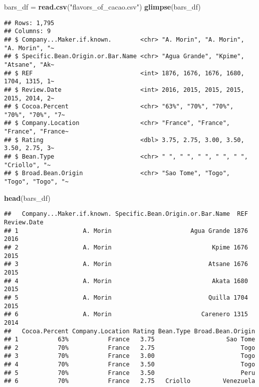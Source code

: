 \documentclass[
]{article}
\newenvironment{Shaded}{\begin{snugshade}}{\end{snugshade}}
\newcommand{\FunctionTok}[1]{\textcolor[rgb]{0.13,0.29,0.53}{\textbf{#1}}}
\newcommand{\NormalTok}[1]{#1}
\newcommand{\OtherTok}[1]{\textcolor[rgb]{0.56,0.35,0.01}{#1}}
\newcommand{\StringTok}[1]{\textcolor[rgb]{0.31,0.60,0.02}{#1}}
\begin{document}
\begin{Shaded}
\begin{Highlighting}[]
\NormalTok{bars\_df }\OtherTok{=} \FunctionTok{read.csv}\NormalTok{(}\StringTok{"flavors\_of\_cacao.csv"}\NormalTok{)}
\FunctionTok{glimpse}\NormalTok{(bars\_df)}
\end{Highlighting}
\end{Shaded}

\begin{verbatim}
## Rows: 1,795
## Columns: 9
## $ Company...Maker.if.known.        <chr> "A. Morin", "A. Morin", "A. Morin", "~
## $ Specific.Bean.Origin.or.Bar.Name <chr> "Agua Grande", "Kpime", "Atsane", "Ak~
## $ REF                              <int> 1876, 1676, 1676, 1680, 1704, 1315, 1~
## $ Review.Date                      <int> 2016, 2015, 2015, 2015, 2015, 2014, 2~
## $ Cocoa.Percent                    <chr> "63%", "70%", "70%", "70%", "70%", "7~
## $ Company.Location                 <chr> "France", "France", "France", "France~
## $ Rating                           <dbl> 3.75, 2.75, 3.00, 3.50, 3.50, 2.75, 3~
## $ Bean.Type                        <chr> " ", " ", " ", " ", " ", "Criollo", "~
## $ Broad.Bean.Origin                <chr> "Sao Tome", "Togo", "Togo", "Togo", "~
\end{verbatim}

\begin{Shaded}
\begin{Highlighting}[]
\FunctionTok{head}\NormalTok{(bars\_df)}
\end{Highlighting}
\end{Shaded}

\begin{verbatim}
##   Company...Maker.if.known. Specific.Bean.Origin.or.Bar.Name  REF Review.Date
## 1                  A. Morin                      Agua Grande 1876        2016
## 2                  A. Morin                            Kpime 1676        2015
## 3                  A. Morin                           Atsane 1676        2015
## 4                  A. Morin                            Akata 1680        2015
## 5                  A. Morin                           Quilla 1704        2015
## 6                  A. Morin                         Carenero 1315        2014
##   Cocoa.Percent Company.Location Rating Bean.Type Broad.Bean.Origin
## 1           63%           France   3.75                    Sao Tome
## 2           70%           France   2.75                        Togo
## 3           70%           France   3.00                        Togo
## 4           70%           France   3.50                        Togo
## 5           70%           France   3.50                        Peru
## 6           70%           France   2.75   Criollo         Venezuela
\end{verbatim}
\end{document}
